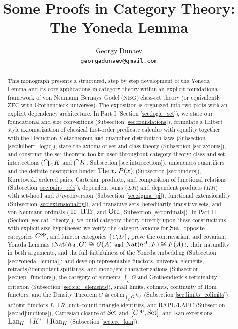 \documentclass[10pt,a4paper]{article}
\title{Some Proofs in Category Theory: The Yoneda Lemma}
\author{Georgy Dunaev \\ \texttt{georgedunaev@gmail.com}}
\date{}
\begin{document}
\sloppy
\maketitle

\begin{abstract}
This monograph presents a structured, step-by-step development of the Yoneda Lemma and its core applications in category theory within an explicit foundational framework of von Neumann--Bernays--G\"odel ($\mathrm{NBG}$) class-set theory (or equivalently $\mathrm{ZFC}$ with Grothendieck universes). The exposition is organized into two parts with an explicit dependency architecture. In Part I (Section \ref{sec:logic_set}), we state our foundational and size conventions (Subsection \ref{sec:foundations}), formulate a Hilbert-style axiomatization of classical first-order predicate calculus with equality together with the Deduction Metatheorem and quantifier distribution laws (Subsection \ref{sec:hilbert_logic}), state the axioms of set and class theory (Subsection \ref{sec:axioms}), and construct the set-theoretic toolkit used throughout category theory: class and set intersections (${{\bigcap}_C} K$ and ${\bigcap} K$, Subsection \ref{sec:intersections}), uniqueness quantifiers and the definite description binder ${\textrm{The\,}} x.\ P(x)$ (Subsection \ref{sec:binders}), Kuratowski ordered pairs, Cartesian products, and composition of functional relations (Subsection \ref{sec:pairs_rels}), dependent sums ($\Sigma R$) and dependent products ($\Pi R$) with set-hood and $\beta/\eta$-conversion (Subsection \ref{sec:sigma_pi}), functional extensionality (Subsection \ref{sec:extensionality}), and transitive sets, hereditarily transitive sets, and von Neumann ordinals (${\textrm{Tr}}$, ${\textrm{HTr}}$, and ${\textrm{Ord}}$, Subsection \ref{sec:ordinals}). In Part II (Section \ref{sec:cat_theory}), we build category theory directly upon these constructions with explicit size hypotheses: we verify the category axioms for ${\textrm{Set}}$, opposite categories $C^{\textrm{op}}$, and functor categories $[C, D]$; prove the contravariant and covariant Yoneda Lemmas (${\textrm{Nat}}(h_A, G) \cong G(A)$ and ${\textrm{Nat}}(h^A, F) \cong F(A)$), their naturality in both arguments, and the full faithfulness of the Yoneda embedding (Subsection \ref{sec:yoneda_lemma}); and develop representable functors, universal elements, retracts/idempotent splittings, and mono/epi characterizations (Subsection \ref{sec:rep_functors}), the category of elements $\int_C G$ and Grothendieck's terminality criterion (Subsection \ref{sec:cat_elements}), small limits, colimits, continuity of Hom-functors, and the Density Theorem $G \cong \mathrm{colim}_{\int_C G}\, h_A$ (Subsection \ref{sec:limits_colimits}), adjoint functors $L \dashv R$, unit--counit triangle identities, and RAPL/LAPC (Subsection \ref{sec:adjunctions}), Cartesian closure of ${\textrm{Set}}$ and $[C^{\textrm{op}}, {\textrm{Set}}]$, and Kan extensions ${\mathrm{Lan}}_K \dashv K^* \dashv {\mathrm{Ran}}_K$ (Subsection \ref{sec:ccc_kan}).
\end{abstract}
\end{document}
